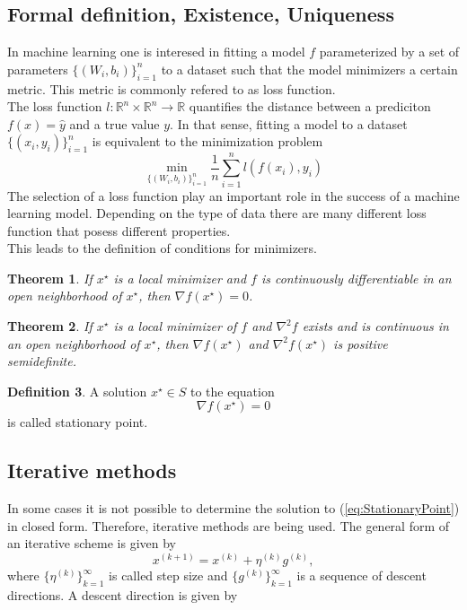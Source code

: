 \documentclass[12pt]{article}
\newtheorem{theorem}{Theorem}[section]
\theoremstyle{definition}
\newtheorem{definition}[theorem]{Definition}
\numberwithin{equation}{section}
\begin{document}
\subsection{Formal definition, Existence, Uniqueness}
In machine learning one is interesed in fitting a model $f$ parameterized by a set of parameters $\{(W_i,b_i)\}_{i=1}^n$ to a dataset such that the model minimizers a certain metric. This metric is commonly refered to as loss function. \\
The loss function $l:\mathbb{R}^n \times \mathbb{R}^n \rightarrow \mathbb{R}$ quantifies the distance between a prediciton $f(x) = \hat{y}$ and a true value $y$. In that sense, fitting a model to a dataset $\{(x_i,y_i)\}_{i=1}^n$ is equivalent to the minimization problem
\begin{equation}
  \min_{\{(W_i,b_i)\}_{i=1}^n} \frac{1}{n}\sum_{i=1}^n l(f(x_i), y_i)
\end{equation}
The selection of a loss function play an important role in the success of a machine learning model. Depending on the type of data there are many different loss function that posess different properties. \\
This leads to the definition of conditions for minimizers.
\begin{theorem}
  If $x^\star$ is a local minimizer and $f$ is continuously differentiable in an open neighborhood of $x^\star$, then $\nabla f(x^\star) = 0$.
\end{theorem}
\begin{theorem}
  If $x^\star$ is a local minimizer of $f$ and $\nabla^2 f$ exists and is continuous in an open neighborhood of $x^\star$, then $\nabla f(x^\star)$ and $\nabla^2f(x^\star)$ is positive semidefinite.
\end{theorem}
\begin{definition}
  A solution $x^\star \in S$ to the equation
  \begin{equation}
  \label{eq:StationaryPoint}
    \nabla f(x^\star) = 0
  \end{equation}
  is called stationary point.
\end{definition}
\subsection{Iterative methods}
In some cases it is not possible to determine the solution to (\ref*{eq:StationaryPoint})
in closed form. Therefore, iterative methods are being used. The general form of an iterative scheme is given by
\begin{equation}
  x^{(k+1)} = x^{(k)} + \eta^{(k)} g^{(k)},
\end{equation}
where $\{\eta^{(k)}\}_{k=1}^\infty$ is called step size and $\{g^{(k)}\}_{k=1}^\infty$ is a sequence of descent directions. A descent direction is given by 
\end{document}
